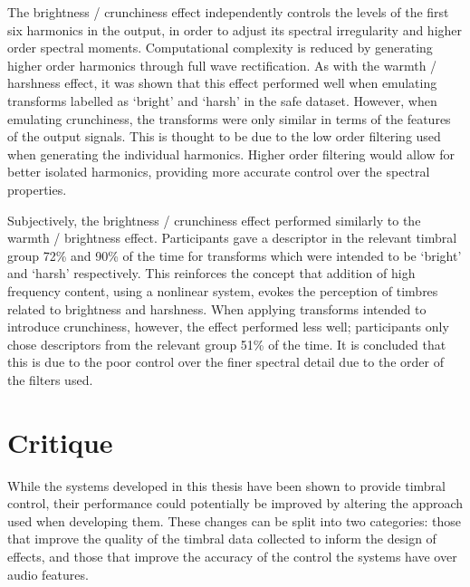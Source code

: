 	The brightness / crunchiness effect independently controls the levels of the first six harmonics in the output, in
	order to adjust its spectral irregularity and higher order spectral moments. Computational complexity is reduced by
	generating higher order harmonics through full wave rectification. As with the warmth / harshness effect, it was
	shown that this effect performed well when emulating transforms labelled as `bright' and `harsh' in the
	\acrshort{safe} dataset. However, when emulating crunchiness, the transforms were only similar in terms of the
	features of the output signals. This is thought to be due to the low order filtering used when generating the
	individual harmonics. Higher order filtering would allow for better isolated harmonics, providing more accurate
	control over the spectral properties.

	Subjectively, the brightness / crunchiness effect performed similarly to the warmth / brightness effect.
	Participants gave a descriptor in the relevant timbral group 72\% and 90\% of the time for transforms which were
	intended to be `bright' and `harsh' respectively. This reinforces the concept that addition of high frequency
	content, using a nonlinear system, evokes the perception of timbres related to brightness and harshness. When
	applying transforms intended to introduce crunchiness, however, the effect performed less well; participants only
	chose descriptors from the relevant group 51\% of the time. It is concluded that this is due to the poor control
	over the finer spectral detail due to the order of the filters used.

\section{Critique}
\label{sec:Conclusion-Critique}
	While the systems developed in this thesis have been shown to provide timbral control, their performance could
	potentially be improved by altering the approach used when developing them. These changes can be split into two
	categories: those that improve the quality of the timbral data collected to inform the design of effects, and those
	that improve the accuracy of the control the systems have over audio features.


